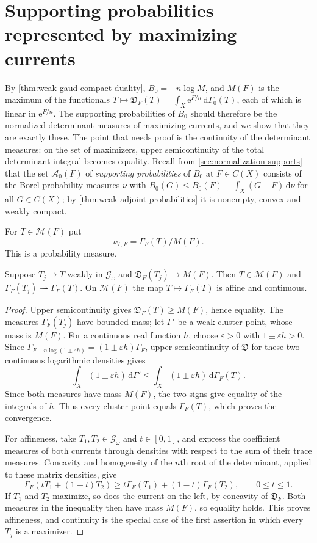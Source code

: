 \section{Supporting probabilities represented by maximizing currents}
\label{sec:gaud-current-adjoints}

By \cref{thm:weak-gaud-compact-duality}, $B_0=-n\log M$, and $M(F)$ is the maximum of the functionals $T\mapsto\mathfrak D_F(T)=\int_X\mathrm{e}^{F/n}\,\mathrm{d}\Gamma_0(T)$, each of which is linear in $\mathrm{e}^{F/n}$. The supporting probabilities of $B_0$ should therefore be the normalized determinant measures of maximizing currents, and we show that they are exactly these. The point that needs proof is the continuity of the determinant measures: on the set of maximizers, upper semicontinuity of the total determinant integral becomes equality. Recall from \cref{sec:normalization-supports} that the set $\mathcal A_0(F)$ of \emph{supporting probabilities} of $B_0$ at $F\in C(X)$ consists of the Borel probability measures $\nu$ with $B_0(G)\leq B_0(F)-\int_X(G-F)\,\mathrm{d}\nu$ for all $G\in C(X)$; by \cref{thm:weak-adjoint-probabilities} it is nonempty, convex and weakly compact.

For $T\in\mathscr M(F)$ put
\[
 \nu_{T,F}=\Gamma_F(T)/M(F).
\]
This is a probability measure.

\begin{lemma}\label{lem:gaud-maximizer-measure-continuity}
Suppose $T_j\to T$ weakly in $\mathscr G_\omega$ and $\mathfrak D_F(T_j)\to M(F)$. Then $T\in\mathscr M(F)$ and $\Gamma_F(T_j)\rightharpoonup\Gamma_F(T)$. On $\mathscr M(F)$ the map $T\mapsto\Gamma_F(T)$ is affine and continuous.
\end{lemma}
\begin{proof}
Upper semicontinuity gives $\mathfrak D_F(T)\geq M(F)$, hence equality. The measures $\Gamma_F(T_j)$ have bounded mass; let $\Gamma'$ be a weak cluster point, whose mass is $M(F)$. For a continuous real function $h$, choose $\varepsilon>0$ with $1\pm\varepsilon h>0$. Since $\Gamma_{F+n\log(1\pm\varepsilon h)}=(1\pm\varepsilon h)\Gamma_F$, upper semicontinuity of $\mathfrak D$ for these two continuous logarithmic densities gives
\[
 \int_X(1\pm\varepsilon h)\,\mathrm{d}\Gamma'
       \leq\int_X(1\pm\varepsilon h)\,\mathrm{d}\Gamma_F(T).
\]
Since both measures have mass $M(F)$, the two signs give equality of the integrals of $h$. Thus every cluster point equals $\Gamma_F(T)$, which proves the convergence.

For affineness, take $T_1,T_2\in\mathscr G_\omega$ and $t\in[0,1]$, and express the coefficient measures of both currents through densities with respect to the sum of their trace measures. Concavity and homogeneity of the $n$th root of the determinant, applied to these matrix densities, give
\[
 \Gamma_F(tT_1+(1-t)T_2)
    \geq t\Gamma_F(T_1)+(1-t)\Gamma_F(T_2),\qquad 0\leq t\leq1.
\]
If $T_1$ and $T_2$ maximize, so does the current on the left, by concavity of $\mathfrak D_F$. Both measures in the inequality then have mass $M(F)$, so equality holds. This proves affineness, and continuity is the special case of the first assertion in which every $T_j$ is a maximizer.
\end{proof}

